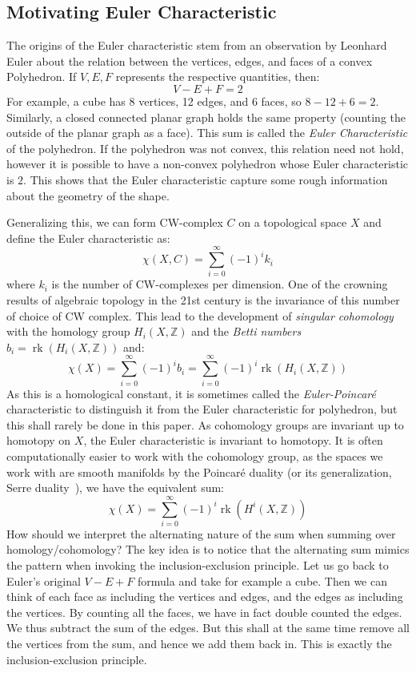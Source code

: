 \documentclass{book}
\newcommand{\Z}{{\mathbb{Z}}}
\newcommand{\rk}{{\operatorname{rk}}}
\begin{document}
\subsection{Motivating Euler Characteristic}

The origins of the Euler characteristic stem from an observation by Leonhard Euler about the relation between
the vertices, edges, and faces of a convex Polyhedron. If $V,E,F$ represents the respective quantities, then:
\[
  V-E+F = 2
\]
For example, a cube has 8 vertices, 12 edges, and 6 faces, so $8-12+6 = 2$. Similarly, a closed connected
planar graph holds the same property (counting the outside of the planar graph as a face). This sum is called
the \emph{Euler Characteristic} of the polyhedron. If the polyhedron was not convex, this relation need not
hold, however it is possible to have a non-convex polyhedron whose Euler characteristic is $2$. This shows
that the Euler characteristic capture some rough information about the geometry of the shape.


Generalizing this, we can form CW-complex $C$ on a topological space $X$ and define the Euler characteristic
as:
\[
  \chi(X, C) = \sum_{i=0}^\infty (-1)^ik_i
\]
where $k_i$ is the number of CW-complexes per dimension. One of the crowning results of algebraic topology in
the 21st century is the invariance of this number of choice of CW complex. This lead to the development of
\emph{singular cohomology} with the homology group $H_i(X, \Z)$ and the \emph{Betti numbers} $b_i = \rk(H_i(X,
\Z))$ and:
\[
  \chi(X) = \sum_{i=0}^\infty (-1)^ib_i = \sum_{i=0}^\infty (-1)^i\rk(H_i(X, \Z))
\]
As this is a homological constant, it is sometimes called the \emph{Euler-Poincar\'e} characteristic to
distinguish it from the Euler characteristic for polyhedron, but this shall rarely be done in this paper. As
cohomology groups are invariant up to homotopy on $X$, the Euler characteristic is invariant to homotopy. It
is often computationally easier to work with the cohomology group, as the spaces we work with are smooth
manifolds by the Poincar\'e duality \cite[section~4.3]{NateAlgTop} (or its generalization, Serre
duality~\cite[section~5.3]{NateAlgGeo}), we have the equivalent sum:
\[
  \chi(X) =  \sum_{i=0}^\infty (-1)^i\rk(H^i(X, \Z))
\]
How should we interpret the alternating nature of the sum when summing over homology/cohomology? The key idea
is to notice that the alternating sum mimics the pattern when invoking the inclusion-exclusion principle.
Let us go back to Euler's original $V-E+F$ formula and take for example a cube. Then we can think of
each face as including the vertices and edges, and the edges as including the vertices. By counting all the
faces, we have in fact double counted the edges. We thus subtract the sum of the edges. But this shall at the
same time remove all the vertices from the sum, and hence we add them back in. This is exactly the
inclusion-exclusion principle.
\end{document}
